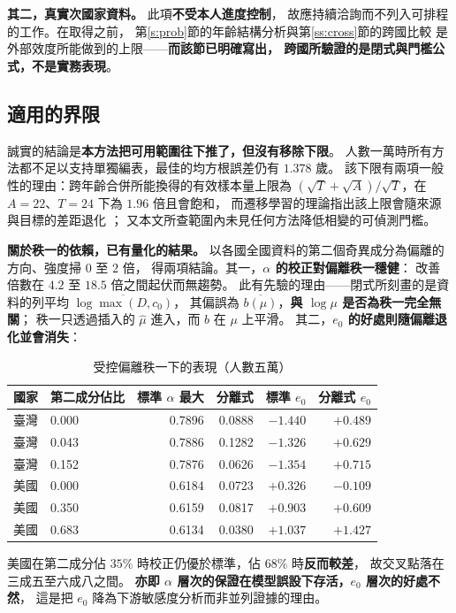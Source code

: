 \documentclass[UTF8, fontset=macnew, a4paper, 12pt]{ctexart}
\begin{document}
\textbf{其二，真實次國家資料。} 此項\textbf{不受本人進度控制}，
故應持續洽詢而不列入可排程的工作。在取得之前，
第\ref{s:prob}節的年齡結構分析與第\ref{ss:cross}節的跨國比較
是外部效度所能做到的上限——\textbf{而該節已明確寫出，
跨國所驗證的是閉式與門檻公式，不是實務表現}。

\subsection{適用的界限}

誠實的結論是\textbf{本方法把可用範圍往下推了，但沒有移除下限}。
人數一萬時所有方法都不足以支持單獨編表，最佳的均方根誤差仍有 $1.378$ 歲。
該下限有兩項一般性的理由：跨年齡合併所能換得的有效樣本量上限為
$(\sqrt T+\sqrt A)/\sqrt T$，在 $A=22$、$T=24$ 下為 $1.96$ 倍且會飽和，
而遷移學習的理論指出該上限會隨來源與目標的差距退化 \citep{reeve2021}；
又本文所查範圍內未見任何方法降低相變的可偵測門檻。

\textbf{關於秩一的依賴，已有量化的結果。}
以各國全國資料的第二個奇異成分為偏離的方向、強度掃 $0$ 至 $2$ 倍，
得兩項結論。其一，\textbf{$\alpha$ 的校正對偏離秩一穩健}：
改善倍數在 $4.2$ 至 $18.5$ 倍之間起伏而無趨勢。
此有先驗的理由——閉式所刻畫的是資料的列平均 $\overline{\log\max(D,c_0)}$，
其偏誤為 $\overline{b(\mu)}$，\textbf{與 $\log\mu$ 是否為秩一完全無關}；
秩一只透過插入的 $\hat\mu$ 進入，而 $b$ 在 $\mu$ 上平滑。
其二，\textbf{$e_0$ 的好處則隨偏離退化並會消失}：

\begin{table}[H]
\centering
\caption{受控偏離秩一下的表現（人數五萬）}
\small
\begin{tabular}{llrrrr}
\toprule
國家 & 第二成分佔比 & 標準 $\alpha$ 最大 & 分離式 & 標準 $e_0$ & 分離式 $e_0$\\
\midrule
臺灣 & 0.000 & 0.7896 & 0.0888 & $-1.440$ & $+0.489$\\
臺灣 & 0.043 & 0.7886 & 0.1282 & $-1.326$ & $+0.629$\\
臺灣 & 0.152 & 0.7876 & 0.0626 & $-1.354$ & $+0.715$\\
美國 & 0.000 & 0.6184 & 0.0723 & $+0.326$ & $-0.109$\\
美國 & 0.350 & 0.6159 & 0.0817 & $+0.903$ & $+0.609$\\
美國 & 0.683 & 0.6134 & 0.0380 & $\mathbf{+1.037}$ & $\mathbf{+1.427}$\\
\bottomrule
\end{tabular}
\label{t:rank2}
\end{table}

美國在第二成分佔 $35\%$ 時校正仍優於標準，佔 $68\%$ 時\textbf{反而較差}，
故交叉點落在三成五至六成八之間。
\textbf{亦即 $\alpha$ 層次的保證在模型誤設下存活，$e_0$ 層次的好處不然}，
這是把 $e_0$ 降為下游敏感度分析而非並列證據的理由。
\end{document}
